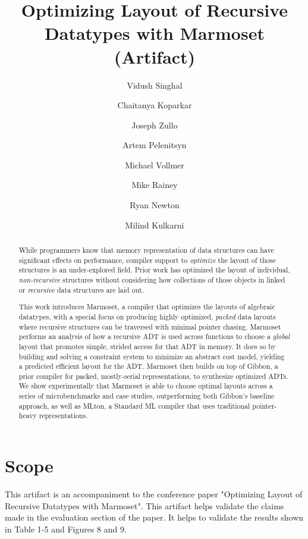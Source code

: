 \documentclass[a4paper,UKenglish, authorcolumns]{darts-v2021}
\title{Optimizing Layout of Recursive Datatypes with Marmoset (Artifact)} %
\author{Vidush Singhal}{Purdue University, USA}
{singhav@purdue.edu}{https://orcid.org/0000-0001-6912-3840}
{}
\author{Chaitanya Koparkar}{Indiana University, USA}
{ckoparka@indiana.edu}{https://orcid.org/0000-0002-4515-8499}
{}
\author{Joseph Zullo}{Purdue University, USA}
{jzullo@purdue.edu}{https://orcid.org/0000-0002-3908-9853}
{}
\author{Artem Pelenitsyn}{Purdue University, USA}
{apelenit@purdue.edu}{https://orcid.org/0000-0001-8334-8106}
{}
\author{Michael Vollmer}{University of Kent, UK}
{M.Vollmer@kent.ac.uk}{https://orcid.org/0000-0002-0496-8268}
{}
\author{Mike Rainey}{Carnegie Mellon University, USA}
{me@mike-rainey.site}{https://orcid.org/0009-0002-9659-1636}
{}
\author{Ryan Newton}{Purdue University, USA}
{rrnewton@purdue.edu}{https://orcid.org/0000-0003-3934-9165}
{}
\author{Milind Kulkarni}{Purdue University, USA}
{milind@purdue.edu}{https://orcid.org/0000-0001-6827-345X}
{}
\newenvironment{scope}{\section{Scope}}{}
\newcommand{\system}{{\sc Marmoset}\xspace}
\newcommand{\gibbon}{{\sc Gibbon}\xspace}
\newcommand{\mlton}{{\sc MLton}\xspace}
\begin{document}
\maketitle

\begin{abstract}
    While programmers know that memory representation of data structures can have significant effects
    on performance, compiler support to {\em optimize} the layout of those structures is an under-explored field.
    Prior work has optimized the layout of individual, \textit{non-recursive} structures without considering how
    collections of those objects in linked or \textit{recursive} data structures are laid out.
    
    
    This work introduces \system, a compiler that optimizes the layouts of algebraic datatypes, with a special focus
    on producing highly optimized, {\em packed} data layouts where recursive structures can be traversed with minimal
    pointer chasing. \system performs an analysis of how a recursive ADT is used across functions to choose a \textit{global} layout
    that promotes simple, strided access for that ADT in memory. It does so by building and solving a constraint system
    to minimize an abstract cost model, yielding a predicted efficient layout for the ADT. \system then builds on top
    of \gibbon, a prior compiler for packed, mostly-serial representations, to synthesize optimized ADTs. We show experimentally
    that \system is able to choose optimal layouts across a series of microbenchmarks and case studies, outperforming both
    \gibbon's baseline approach, as well as \mlton, a Standard ML compiler that uses traditional
    pointer-heavy representations.
\end{abstract}


\begin{scope}

This artifact is an accompaniment to the conference paper "Optimizing Layout of Recursive Datatypes with Marmoset".
This artifact helps validate the claims made in the evaluation section of the paper. 
It helps to validate the results shown in Table 1-5 and Figures 8 and 9. 
\end{scope}
\end{document}
